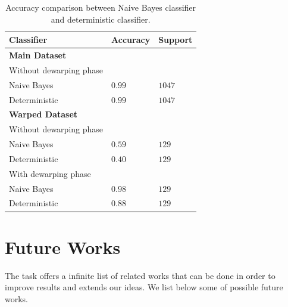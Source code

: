 \documentclass[10pt,twocolumn,letterpaper]{article}
\begin{document}
\begin{table}[!h]
  \begin{center}
    \begin{tabular}{lll}
      \hline
      Classifier              & Accuracy & Support \\ \hline
      \textbf{Main Dataset}                        \\
      \small Without dewarping phase               \\
      \; \; Naive Bayes       & $0.99$   & $1047$  \\
      \; \; Deterministic     & $0.99$   & $1047$  \\ \hline

      \textbf{Warped Dataset} &          &         \\
      \small Without dewarping phase               \\
      \; \; Naive Bayes       & $0.59$   & $129$   \\
      \; \; Deterministic     & $0.40$   & $129$   \\

      \small With dewarping phase                  \\
      \; \; Naive Bayes       & $0.98$   & $129$   \\
      \; \; Deterministic     & $0.88$   & $129$   \\ \hline
    \end{tabular}
  \end{center}
  \label{table:classifiers-comparison}
  \caption{Accuracy comparison between Naive Bayes classifier and
    deterministic classifier.}
\end{table}

\section{Future Works}
\label{sec:future-works}

The task offers a infinite list of related works that can be done in
order to improve results and extends our ideas. We list below some of
possible future works.
\end{document}

